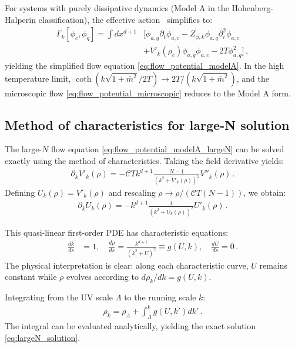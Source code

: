 \documentclass[reprint,twocolumn,superscriptaddress,preprintnumbers,amsmath,amssymb,aps,prd,floatfix]{revtex4-2}
\begin{document}
For systems with purely dissipative dynamics (Model A in the Hohenberg-Halperin classification), the effective action~\cite{Chen:2023tqc} simplifies to:
\begin{align}
	\Gamma_k\left[\phi_c, \phi_q\right]=\int dx^{d+1}&\Big[\phi_{a,q}\partial_t\phi_{a,c}-Z_{\phi, k}\phi_{a,q}\partial^2_i\phi_{a,c}\nonumber\\[2ex]
	&+V'_k(\rho_c)\phi_{a,q}\phi_{a,c}- 2T\phi_{a,q}^2 \Big]\,,
\end{align}
yielding the simplified flow equation \eqref{eq:flow_potential_modelA}. In the high temperature limit, $\coth(k\sqrt{1+\bar{m}^2}/2T)\to 2T/(k\sqrt{1+\bar{m}^2})$, and the microscopic flow \eqref{eq:flow_potential_microscopic} reduces to the Model A form.

\subsection{Method of characteristics for large-N solution}
\label{app:characteristics}

The large-$N$ flow equation \eqref{eq:flow_potential_modelA_largeN} can be solved exactly using the method of characteristics. Taking the field derivative yields:
\begin{align}
	\partial_k V'_k(\rho)=-\mathscr{C}T k^{d+1} \frac{N-1}{(k^2+V'_k(\rho))^2}V''_k(\rho)\,.
\end{align}
Defining $U_k(\rho)=V'_k(\rho)$ and rescaling $\rho\to \rho/(\mathscr{C}T(N-1))$, we obtain:
\begin{align}
	\partial_k U_k(\rho)=-k^{d+1} \frac{1}{(k^2+U_k(\rho))^2}U'_k(\rho)\,.
\end{align}

This quasi-linear first-order PDE has characteristic equations:
\begin{align}
	\frac{dk}{ds} &= 1, \quad
	\frac{d\rho}{ds} = \frac{k^{d+1}}{(k^2+U)^2}\equiv g(U,k), \quad
	\frac{dU}{ds} = 0\,.
\end{align}
The physical interpretation is clear: along each characteristic curve, $U$ remains constant while $\rho$ evolves according to $d\rho_k/dk = g(U,k)$.

Integrating from the UV scale $\Lambda$ to the running scale $k$:
\begin{align}
	\rho_k = \rho_{\Lambda} + \int_{\Lambda}^{k} g(U,k') dk'\,.
\end{align}
The integral can be evaluated analytically, yielding the exact solution \eqref{eq:largeN_solution}.
\end{document}
